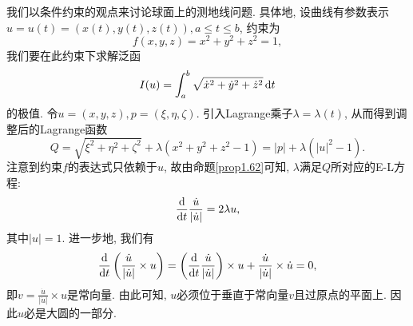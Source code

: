 \begin{example}[球面上的测地线]
    我们以条件约束的观点来讨论球面上的测地线问题. 具体地, 设曲线有参数表示$u= u(t) = (x(t), y(t), z(t)), a \leq t \leq b$, 约束为 
    \begin{equation*}
        f(x, y, z) = x^2 + y^2 + z^2 = 1,
    \end{equation*}
    我们要在此约束下求解泛函 
    \begin{equation*}
        I(u) = \int_a^b \sqrt{\dot x^2 + \dot y^2 + \dot z^2} \,{\rm d}t
    \end{equation*}
    的极值. 令$u = (x, y, z), p = (\xi, \eta, \zeta)$. 引入Lagrange乘子$\lambda = \lambda(t)$, 从而得到调整后的Lagrange函数 
    \begin{equation*}
        Q = \sqrt{\xi^2 + \eta^2 + \zeta^2} + \lambda(x^2 + y^2 + z^2 - 1) = |p| + \lambda(|u|^2 - 1).
    \end{equation*}
    注意到约束$f$的表达式只依赖于$u$, 故由命题\eqref{prop1.62}可知, $\lambda$满足$Q$所对应的E-L方程:
    \begin{equation*}
        \frac{{\rm d}}{{\rm d}t}\frac{\dot u}{|\dot u|} = 2\lambda u,
    \end{equation*}
    其中$|u| = 1$. 进一步地, 我们有
    \begin{equation*}
        \frac{{\rm d}}{{\rm d}t}\left(\frac{\dot u}{|\dot u|} \times u\right) = \left(\frac{{\rm d}}{{\rm d}t}\frac{\dot u}{|\dot u|}\right) \times u + \frac{\dot u}{|\dot u|} \times \dot u = 0,
    \end{equation*}
    即$v= \frac{\dot u}{|\dot u|} \times u$是常向量. 由此可知, $u$必须位于垂直于常向量$v$且过原点的平面上.
    因此$u$必是大圆的一部分.
\end{example}

